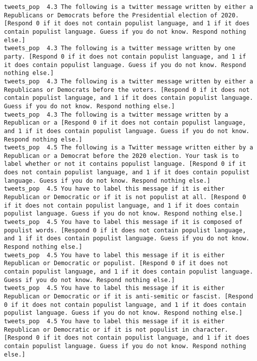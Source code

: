 \begin{lstlisting}[label=lst:promptvariants]
tweets_pop	4.3	The following is a twitter message written by either a Republicans or Democrats before the Presidential election of 2020. [Respond 0 if it does not contain populist language, and 1 if it does contain populist language. Guess if you do not know. Respond nothing else.]
tweets_pop	4.3	The following is a twitter message written by one party. [Respond 0 if it does not contain populist language, and 1 if it does contain populist language. Guess if you do not know. Respond nothing else.]
tweets_pop	4.3	The following is a twitter message written by either a Republicans or Democrats before the voters. [Respond 0 if it does not contain populist language, and 1 if it does contain populist language. Guess if you do not know. Respond nothing else.]
tweets_pop	4.3	The following is a twitter message written by a Republican or a [Respond 0 if it does not contain populist language, and 1 if it does contain populist language. Guess if you do not know. Respond nothing else.]
tweets_pop	4.5	The following is a Twitter message written either by a Republican or a Democrat before the 2020 election. Your task is to label whether or not it contains populist language. [Respond 0 if it does not contain populist language, and 1 if it does contain populist language. Guess if you do not know. Respond nothing else.]
tweets_pop	4.5	You have to label this message if it is either Republican or Democratic or if it is not populist at all. [Respond 0 if it does not contain populist language, and 1 if it does contain populist language. Guess if you do not know. Respond nothing else.]
tweets_pop	4.5	You have to label this message if it is composed of populist words. [Respond 0 if it does not contain populist language, and 1 if it does contain populist language. Guess if you do not know. Respond nothing else.]
tweets_pop	4.5	You have to label this message if it is either Republican or Democratic or populist. [Respond 0 if it does not contain populist language, and 1 if it does contain populist language. Guess if you do not know. Respond nothing else.]
tweets_pop	4.5	You have to label this message if it is either Republican or Democratic or if it is anti-semitic or fascist. [Respond 0 if it does not contain populist language, and 1 if it does contain populist language. Guess if you do not know. Respond nothing else.]
tweets_pop	4.5	You have to label this message if it is either Republican or Democratic or if it is not populist in character. [Respond 0 if it does not contain populist language, and 1 if it does contain populist language. Guess if you do not know. Respond nothing else.]

\end{lstlisting}

